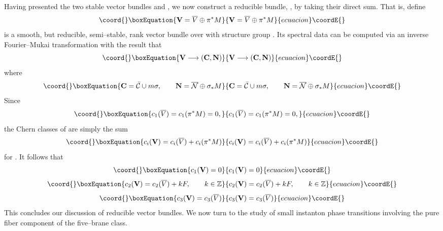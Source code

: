 \documentclass[a4paper,12pt]{article}
\numberwithin{equation}{section}
\providecommand{\bC}{{\mathbf C}}
\providecommand{\bN}{{\mathbf N}}
\providecommand{\bV}{{\mathbf V}}
\def\cN{{\mathcal N}}
\theoremstyle{plain}
\begin{document}
Having presented the two stable vector bundles \coordHE{} and
\coordHE{}, 
we now construct a reducible bundle, \myHighlight{$\bV$}\coordHE{}, by taking their
direct sum.  That
is, define
\begin{equation}\coord{}\boxEquation{
\bV= \overline{V} \oplus \pi^{*}M
\label{eq:135}
}{
\bV= \overline{V} \oplus \pi^{*}M
}{ecuacion}\coordE{}\end{equation}
\myHighlight{$\bV$}\coordHE{} is a smooth, but reducible, semi--stable, 
 rank \coordHE{} vector bundle over \coordHE{} with
structure group \coordHE{}. Its spectral data can be computed via an
inverse Fourier--Mukai transformation with the result that
\begin{equation}\coord{}\boxEquation{
\bV \longrightarrow (\bC, \bN)
\label{eq:136}
}{
\bV \longrightarrow (\bC, \bN)
}{ecuacion}\coordE{}\end{equation}
where
\begin{equation}\coord{}\boxEquation{
\bC =\bar{\cal{C}}\cup m\sigma, \qquad 
\bN =\overline{\cN}\oplus \sigma_{*}M
\label{eq:137}
}{
\bC =\bar{\cal{C}}\cup m\sigma, \qquad 
\bN =\overline{\cN}\oplus \sigma_{*}M
}{ecuacion}\coordE{}\end{equation}
Since
\begin{equation}\coord{}\boxEquation{
c_{1}(\overline{V})=c_{1}(\pi^{*}M)=0,
\label{eq:138}
}{
c_{1}(\overline{V})=c_{1}(\pi^{*}M)=0,
}{ecuacion}\coordE{}\end{equation}
the Chern classes of \myHighlight{$\bV$}\coordHE{} are simply the sum
\begin{equation}\coord{}\boxEquation{
c_{i}(\bV)=c_{i}(\overline{V}) +c_{i}(\pi^{*}M)
\label{eq:139}
}{
c_{i}(\bV)=c_{i}(\overline{V}) +c_{i}(\pi^{*}M)
}{ecuacion}\coordE{}\end{equation}
for \coordHE{}. It follows that 
\begin{equation}\coord{}\boxEquation{
c_{1}(\bV)=0
\label{eq:140}
}{
c_{1}(\bV)=0
}{ecuacion}\coordE{}\end{equation}
\begin{equation}\coord{}\boxEquation{
c_{2}(\bV)=c_{2}(\overline{V}) +kF, \qquad k\in {\mathbb Z}
\label{eq:141}
}{
c_{2}(\bV)=c_{2}(\overline{V}) +kF, \qquad k\in {\mathbb Z}
}{ecuacion}\coordE{}\end{equation}
\begin{equation}\coord{}\boxEquation{
c_{3}(\bV)=c_{3}(\overline{V})
\label{eq:142}
}{
c_{3}(\bV)=c_{3}(\overline{V})
}{ecuacion}\coordE{}\end{equation}
This concludes our discussion of reducible \coordHE{} vector
bundles. We now turn to the study of small instanton phase transitions
involving 
the pure fiber component of the five--brane class.
\end{document}
